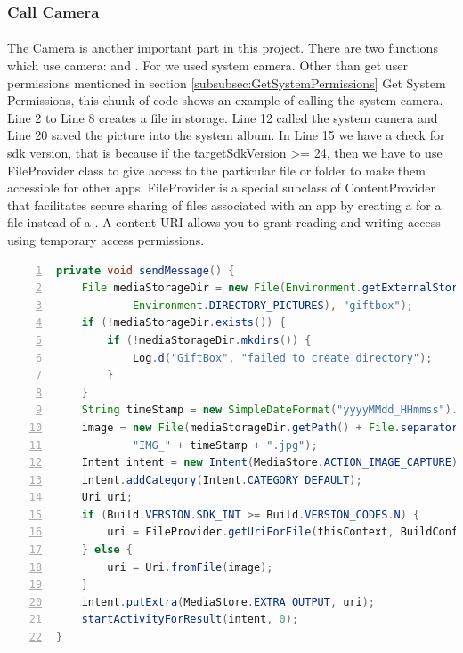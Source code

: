 \subsubsection{Call Camera}
\label{CallCamera}
\paragraph{} The Camera is another important part in this project. There are two functions which use camera:  and .
For  we used system camera. Other than get user permissions mentioned in section \ref{subsubsec:GetSystemPermissions} Get System Permissions, this chunk of code shows an example of calling the system camera. Line 2 to Line 8 creates a file in storage. Line 12 called the system camera and Line 20 saved the picture into the system album. In Line 15 we have a check for sdk version, that is because if the targetSdkVersion >= 24, then we have to use FileProvider class to give access to the particular file or folder to make them accessible for other apps. FileProvider is a special subclass of ContentProvider that facilitates secure sharing of files associated with an app by creating a  for a file instead of a . A content URI allows you to grant reading and writing access using temporary access permissions. 
\begin{lstlisting}[caption={Call Camera},language={java},
        numbers=left,basicstyle=\footnotesize\ttfamily,breaklines=true,xleftmargin=.05\textwidth, xrightmargin=.05\textwidth] 
private void sendMessage() {
    File mediaStorageDir = new File(Environment.getExternalStoragePublicDirectory(
            Environment.DIRECTORY_PICTURES), "giftbox");
    if (!mediaStorageDir.exists()) {
        if (!mediaStorageDir.mkdirs()) {
            Log.d("GiftBox", "failed to create directory");
        }
    }
    String timeStamp = new SimpleDateFormat("yyyyMMdd_HHmmss").format(new Date());
    image = new File(mediaStorageDir.getPath() + File.separator +
            "IMG_" + timeStamp + ".jpg");
    Intent intent = new Intent(MediaStore.ACTION_IMAGE_CAPTURE);
    intent.addCategory(Intent.CATEGORY_DEFAULT);
    Uri uri;
    if (Build.VERSION.SDK_INT >= Build.VERSION_CODES.N) {
        uri = FileProvider.getUriForFile(thisContext, BuildConfig.APPLICATION_ID+".fileprovider", image);//BuildConfig.APPLICATION_ID + ".fileProvider"
    } else {
        uri = Uri.fromFile(image);
    }
    intent.putExtra(MediaStore.EXTRA_OUTPUT, uri);
    startActivityForResult(intent, 0);
}
\end{lstlisting} 
